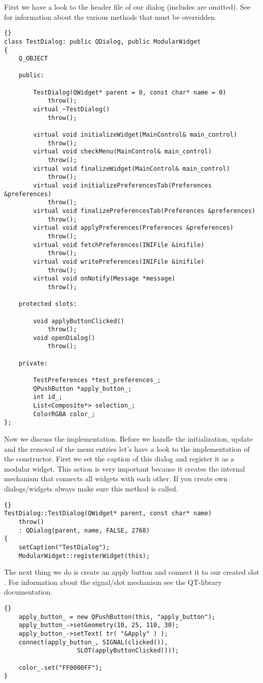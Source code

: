 First we have a look to the header file of our dialog (includes are omitted).
See  for information about the various methods that must
be overridden.
\begin{lstlisting}{}
class TestDialog: public QDialog, public ModularWidget
{
	Q_OBJECT

	public:

		TestDialog(QWidget* parent = 0, const char* name = 0)
			throw();
		virtual ~TestDialog()
			throw();

		virtual void initializeWidget(MainControl& main_control)
			throw();
		virtual void checkMenu(MainControl& main_control)
			throw();
		virtual void finalizeWidget(MainControl& main_control)
			throw();
		virtual void initializePreferencesTab(Preferences &preferences)
			throw();
		virtual void finalizePreferencesTab(Preferences &preferences)
			throw();
		virtual void applyPreferences(Preferences &preferences)
			throw();
		virtual void fetchPreferences(INIFile &inifile)
			throw();
		virtual void writePreferences(INIFile &inifile)
			throw();
		virtual void onNotify(Message *message)
			throw();

	protected slots:
				
		void applyButtonClicked()
			throw();
		void openDialog()
			throw();

	private:

		TestPreferences *test_preferences_;
		QPushButton *apply_button_;
		int id_;
		List<Composite*> selection_;
		ColorRGBA color_;
};
\end{lstlisting}

Now we discuss the implementation. Before we handle the initialization,
update and the removal of the menu entries let's have a look to the
implementation of the constructor. First we set the caption of this dialog
and register it as a modular widget. This action is very important because it
creates the internal mechanism that connects all widgets with each other. If
you create own dialogs/widgets always make sure this method is called.
\begin{lstlisting}{}
TestDialog::TestDialog(QWidget* parent, const char* name)
	throw()
	: QDialog(parent, name, FALSE, 2768)
{
	setCaption("TestDialog");
	ModularWidget::registerWidget(this);
\end{lstlisting}
The next thing we do is create an apply button and connect it to our created
slot . For information about the
signal/slot mechanism see the QT-library documentation.
\begin{lstlisting}{}
	apply_button_ = new QPushButton(this, "apply_button");
	apply_button_->setGeometry(10, 25, 110, 30);
	apply_button_->setText( tr( "&Apply" ) );
	connect(apply_button_, SIGNAL(clicked()), 
					SLOT(applyButtonClicked()));

	color_.set("FF0000FF");
}
\end{lstlisting}

